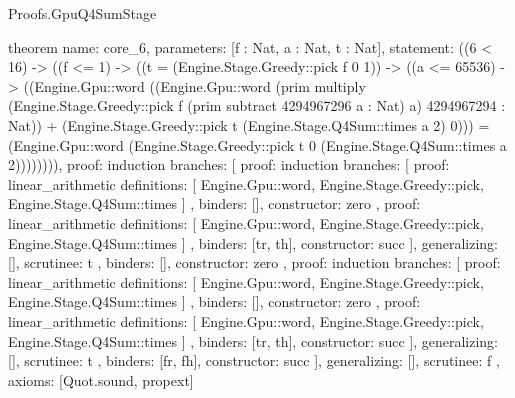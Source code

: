\begin{lexlean}{Proofs.GpuQ4SumStage}
\begin{semanticmodule}
theorem{
  name: core_6,
  parameters: [f : Nat, a : Nat, t : Nat],
  statement: ((6 < 16) -> ((f <= 1) -> ((t = (Engine.Stage.Greedy::pick f 0 1)) -> ((a <= 65536) -> ((Engine.Gpu::word ((Engine.Gpu::word (prim multiply (Engine.Stage.Greedy::pick f (prim subtract 4294967296 a : Nat) a) 4294967294 : Nat)) + (Engine.Stage.Greedy::pick t (Engine.Stage.Q4Sum::times a 2) 0))) = (Engine.Gpu::word (Engine.Stage.Greedy::pick t 0 (Engine.Stage.Q4Sum::times a 2)))))))),
  proof: induction{
    branches: [
      {
        proof: induction{
          branches: [
            {
              proof: linear_arithmetic{
                definitions: [
                  Engine.Gpu::word,
                  Engine.Stage.Greedy::pick,
                  Engine.Stage.Q4Sum::times
                ]
              },
              binders: [],
              constructor: zero
            },
            {
              proof: linear_arithmetic{
                definitions: [
                  Engine.Gpu::word,
                  Engine.Stage.Greedy::pick,
                  Engine.Stage.Q4Sum::times
                ]
              },
              binders: [tr, th],
              constructor: succ
            }
          ],
          generalizing: [],
          scrutinee: t
        },
        binders: [],
        constructor: zero
      },
      {
        proof: induction{
          branches: [
            {
              proof: linear_arithmetic{
                definitions: [
                  Engine.Gpu::word,
                  Engine.Stage.Greedy::pick,
                  Engine.Stage.Q4Sum::times
                ]
              },
              binders: [],
              constructor: zero
            },
            {
              proof: linear_arithmetic{
                definitions: [
                  Engine.Gpu::word,
                  Engine.Stage.Greedy::pick,
                  Engine.Stage.Q4Sum::times
                ]
              },
              binders: [tr, th],
              constructor: succ
            }
          ],
          generalizing: [],
          scrutinee: t
        },
        binders: [fr, fh],
        constructor: succ
      }
    ],
    generalizing: [],
    scrutinee: f
  },
  axioms: [Quot.sound, propext]
}


\end{semanticmodule}
\end{lexlean}
